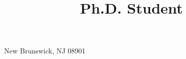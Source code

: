 


\usepackage{url,fancyhdr}

\usepackage{fontspec}
\usepackage{xunicode}
\usepackage{xcolor}

\let\sups\relax
\usepackage{tipa}
\usepackage{multicol}
\usepackage{natbib}
\usepackage{bibentry}
\newcommand{\bibverse}[1]{\begin{verse} \bibentry{#1}. \end{verse}}
\usepackage{hanging}

\usepackage[scale=0.8]{geometry}





\title{Ph.D. Student}
\address{Rutgers University \\ 
         Department of Spanish and Portuguese}{New Brunswick, NJ 08901}
\def\mytitle{Ph.D. Student}
\def\myphone{(848) 932-6934}
\def\myemail{rme70@scarletmail.rutgers.edu}
\def\myweb{https://robertespo.github.io/}
\def\facweb{https://span-port.rutgers.edu/people/ph-d-students-tas/graduate-students/129-current-students-phd-in-bilingualismsla/1094-esposito-robert}
\def\school{Rutgers University}
\def\schoolweb{https://www.rutgers.edu}


